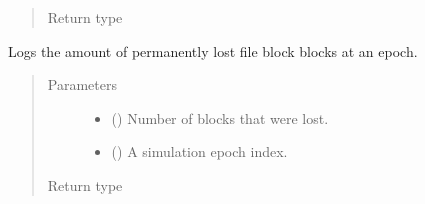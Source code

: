 \documentclass[letterpaper,10pt,english]{sphinxmanual}
\begin{document}
\begin{fulllineitems}
\begin{fulllineitems}
\begin{quote}
\begin{description}
\begin{itemize}
\end{itemize}

\item[{Return type}] \leavevmode
{}

\end{description}\end{quote}

\end{fulllineitems}


\begin{fulllineitems}
\label{\detokenize{app.domain.helpers:app.domain.helpers.smart_dataclasses.LoggingData.log_lost_file_blocks}}
Logs the amount of permanently lost file block blocks at an epoch.
\begin{quote}\begin{description}
\item[{Parameters}] \leavevmode\begin{itemize}
\item {} 
 () \textendash{} Number of blocks that were lost.

\item {} 
 () \textendash{} A simulation epoch index.

\end{itemize}

\item[{Return type}] \leavevmode
{}

\end{description}\end{quote}

\end{fulllineitems}



\end{fulllineitems}
\end{document}
